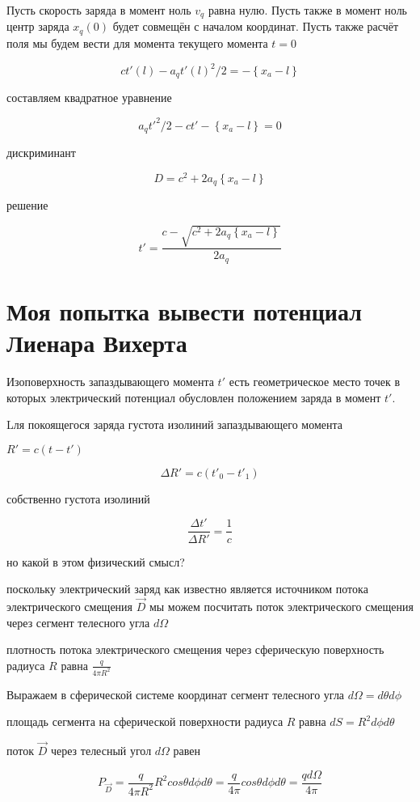 \documentclass{article}
\begin{document}
Пусть скорость заряда в момент ноль $v_q$ равна нулю. Пусть также в момент ноль центр заряда $x_{q}(0)$ будет совмещён с началом координат. Пусть также расчёт поля мы будем вести для момента текущего момента $t = 0$

$$ c t'(l) - a_q {t'(l)}^{2} / 2 = - \left\{x_a -  l\right\}$$

составляем квадратное уравнение

$$ a_q {t'}^{2} / 2 -c t'  - \left\{x_a -  l\right\} = 0$$

дискриминант

$$ D = c^2 + 2  a_q \left\{x_a -  l\right\}$$

решение


$$t' = \frac{c -  \sqrt{c^2 + 2  a_q \left\{x_a -  l\right\}}}{2 a_q}$$






\section{Моя попытка вывести потенциал Лиенара Вихерта}

Изоповерхность запаздывающего момента $t'$ есть геометрическое место точек в которых электрический потенциал обусловлен положением заряда в момент $t'$. 


Lля покоящегося заряда густота изолиний запаздывающего момента 

$R'=c(t-t')$

$$\Delta R' = c(t'_{0} -t'_{1})$$

собственно густота изолиний

$$\frac{\Delta t'}{\Delta R'} = \frac{1}{c}$$

но какой в этом физический смысл?

поскольку электрический заряд как известно является источником потока электрического смещения $\vec D$ мы можем посчитать поток электрического смещения через сегмент телесного угла $d \Omega$

плотность потока электрического смещения через сферическую поверхность радиуса $R$ равна $\frac{q}{4\pi R^2}$

Выражаем в сферической системе координат сегмент телесного угла $d \Omega = d \theta  d \phi$

площадь сегмента на сферической поверхности радиуса $R$ равна $d S = R^2 d \phi d \theta$

поток  $\vec D$ через телесный угол $d \Omega$ равен

$$P_{\vec D} = \frac{q}{4\pi R^2} R^2 cos \theta d \phi d \theta = \frac{q}{4\pi} cos \theta d \phi d\theta= \frac{q d\Omega}{4 \pi}$$
\end{document}
